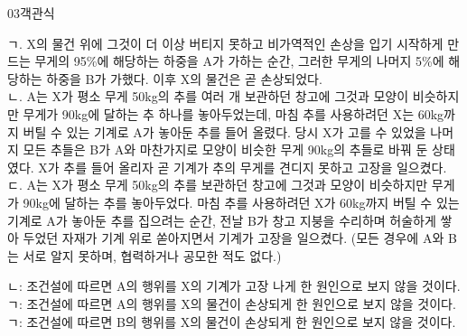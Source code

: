 \documentclass[fs85,seriesWit]{korfarm-base}
\begin{document}
\begin{kfQBlock}{03}{객관식}
\begin{kfEvidence}ㄱ. X의 물건 위에 그것이 더 이상 버티지 못하고 비가역적인 손상을 입기 시작하게 만드는 무게의 95\%에 해당하는 하중을 A가 가하는 순간, 그러한 무게의 나머지 5\%에 해당하는 하중을 B가 가했다. 이후 X의 물건은 곧 손상되었다. \\\relax
ㄴ. A는 X가 평소 무게 50kg의 추를 여러 개 보관하던 창고에 그것과 모양이 비슷하지만 무게가 90kg에 달하는 추 하나를 놓아두었는데, 마침 추를 사용하려던 X는 60kg까지 버틸 수 있는 기계로 A가 놓아둔 추를 들어 올렸다. 당시 X가 고를 수 있었을 나머지 모든 추들은 B가 A와 마찬가지로 모양이 비슷한 무게 90kg의 추들로 바꿔 둔 상태였다. X가 추를 들어 올리자 곧 기계가 추의 무게를 견디지 못하고 고장을 일으켰다. \\\relax
ㄷ. A는 X가 평소 무게 50kg의 추를 보관하던 창고에 그것과 모양이 비슷하지만 무게가 90kg에 달하는 추를 놓아두었다. 마침 추를 사용하려던 X가 60kg까지 버틸 수 있는 기계로 A가 놓아둔 추를 집으려는 순간, 전날 B가 창고 지붕을 수리하며 허술하게 쌓아 두었던 자재가 기계 위로 쏟아지면서 기계가 고장을 일으켰다. (모든 경우에 A와 B는 서로 알지 못하며, 협력하거나 공모한 적도 없다.)\end{kfEvidence}
\begin{kfChoices}
\kfChoice ㄴ: 조건설에 따르면 A의 행위를 X의 기계가 고장 나게 한 원인으로 보지 않을 것이다.
\kfChoice ㄱ: 조건설에 따르면 A의 행위를 X의 물건이 손상되게 한 원인으로 보지 않을 것이다.
\kfChoice ㄱ: 조건설에 따르면 B의 행위를 X의 물건이 손상되게 한 원인으로 보지 않을 것이다.
\end{kfChoices}
\end{kfQBlock}
\end{document}
